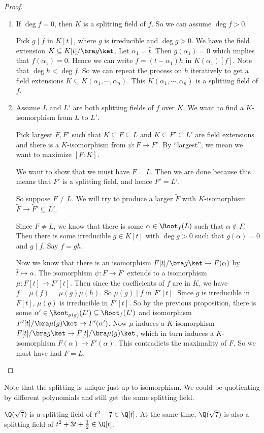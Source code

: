 \documentclass[a4paper]{article}
\begin{document}
\begin{proof}\leavevmode
  \begin{enumerate}
    \item If $\deg f = 0$, then $K$ is a splitting field of $f$. So we can assume $\deg f > 0$.

      Pick $g \mid f$ in $K[t]$, where $g$ is irreducible and $\deg g > 0$. We have the field extension $K\subseteq K[t]/\bra g\ket$. Let $\alpha_1 = \bar t$. Then $g(\alpha_1) = 0$ which implies that $f(\alpha_1) = 0$. Hence we can write $f = (t - \alpha_1) h$ in $K(\alpha_1)[f]$. Note that $\deg h < \deg f$. So we can repeat the process on $h$ iteratively to get a field extensions $K\subseteq K(\alpha_1, \cdots, \alpha_n)$. This $K(\alpha_1, \cdots, \alpha_n)$ is a splitting field of $f$.

    \item Assume $L$ and $L'$ are both splitting fields of $f$ over $K$. We want to find a $K$-isomorphism from $L$ to $L'$.

      Pick largest $F, F'$ such that $K \subseteq F\subseteq L$ and $K\subseteq F' \subseteq L'$ are field extensions and there is a $K$-isomorphism from $\psi: F \to F'$. By ``largest'', we mean we want to maximize $[F:K]$.

      We want to show that we must have $F = L$. Then we are done because this means that $F'$ is a splitting field, and hence $F' = L'$.

      So suppose $F\not= L$. We will try to produce a larger $\tilde{F}$ with $K$-isomorphism $\tilde{F} \to \tilde{F}' \subseteq L'$.

      Since $F\not= L$, we know that there is some $\alpha \in \Root_f(L)$ such that $\alpha\not\in F$. Then there is some irreducible $g\in K[t]$ with $\deg g > 0$ such that $g(\alpha) = 0$ and $g \mid f$. Say $f = gh$.

      Now we know that there is an isomorphism $F[t]/\bra g\ket \to F(\alpha)$ by $\bar t \mapsto \alpha$. The isomorphism $\psi: F \to F'$ extends to a isomorphism $\mu: F[t] \to F'[t]$. Then since the coefficients of $f$ are in $K$, we have $f = \mu(f) = \mu(g)\mu(h)$. So $\mu(g) \mid f$ in $F'[t]$. Since $g$ is irreducible in $F[t]$, $\mu(g)$ is irreducible in $F'[t]$. So by the previous proposition, there is some $\alpha' \in \Root_{\mu(g)}(L') \subseteq \Root_f(L')$ and isomorphism $F'[t]/\bra \mu(g)\ket \to F'(\alpha')$.
      Now $\mu$ induces a $K$-isomorphism $F[t]/\bra g\ket \to F[t]/\bra \mu(g)\ket$, which in turn induces a $K$-isomorphism $F(\alpha) \to F'(\alpha)$. This contradicts the maximality of $F$. So we must have had $F = L$.
  \end{enumerate}
\end{proof}
Note that the splitting is unique just up to isomorphism. We could be quotienting by different polynomials and still get the same splitting field.
\begin{eg}
  $\Q(\sqrt{7})$ is a splitting field of $t^2 - 7\in \Q[t]$. At the same time, $\Q(\sqrt{7})$ is also a splitting field of $t^2 + 3t + \frac{1}{2} \in \Q[t]$.
\end{eg}
\end{document}
